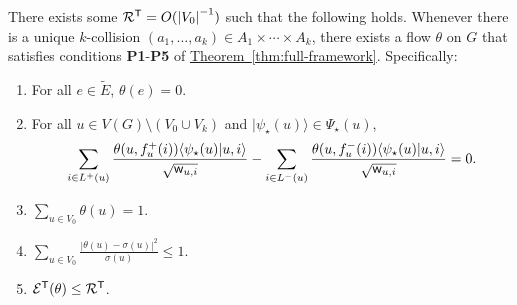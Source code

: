 \documentclass{article}
\newcommand{\thm}[1]{\hyperref[thm:#1]{Theorem~\ref*{thm:#1}}}
\def\ket#1{{\lvert}#1\rangle}
\renewcommand{\>}{\rangle}
\newcommand{\<}{\langle}
\renewcommand{\(}{\left(}
\renewcommand{\)}{\right)}
\def\braket#1#2{{{\langle}#1\vert}#2\rangle}
\def\abs#1{\left| #1 \right|}
\def\w{{\sf w}}
\begin{document}
\begin{lemma}\label{lem:k-dist-positive}
	There exists some ${\cal R}^{\sf T}=O(\abs{V_0}^{-1})$ such that the following holds. Whenever there is a unique $k$-collision $(a_1,\dots,a_k)\in A_1\times \cdots \times A_k$, there exists a flow $\theta$ on $G$ that satisfies conditions \textbf{P1}-\textbf{P5} of \thm{full-framework}. Specifically:
	\begin{enumerate}
		\item For all $e\in\tilde{E}$, $\theta(e)=0$.
		\item For all $u\in V(G)\setminus (V_0\cup V_k)$ and $\ket{\psi_\star(u)}\in \Psi_\star(u)$, 
		$$\sum_{i\in L^+(u)}\frac{\theta(u,f^+_u(i))\braket{\psi_\star(u)}{u,i}}{\sqrt{\w_{u,i}}}-\sum_{i\in L^-(u)}\frac{\theta(u,f^-_u(i))\braket{\psi_\star(u)}{u,i}}{\sqrt{\w_{u,i}}}=0.$$
		\item $\sum_{u\in  V_0}\theta(u)=1$.
		\item $\sum_{u\in V_0}\frac{|\theta(u)-\sigma(u)|^2}{\sigma(u)}\leq 1$.
		\item ${\cal E}^{\sf T}(\theta)\leq {\cal R}^{\sf T}$.
	\end{enumerate}
\end{lemma}
\end{document}
